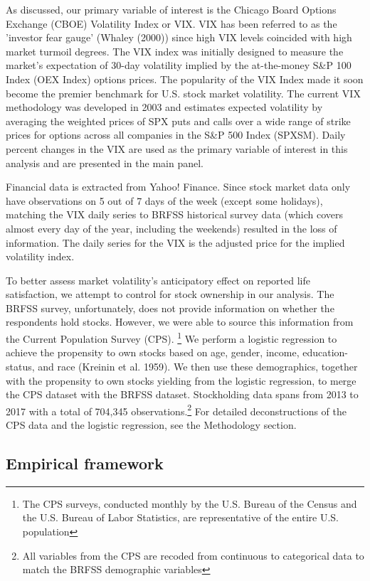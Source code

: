 \documentclass[11pt,a4paper,oldfontcommands]{memoir}
\begin{document}
{As discussed, our primary variable of interest is the Chicago Board Options Exchange (CBOE) Volatility Index or VIX. VIX has been referred to as the 'investor fear gauge' (Whaley (2000)) since high VIX levels coincided with high market turmoil degrees. The VIX index was initially designed to measure the market's expectation of 30-day volatility implied by the at-the-money S&P 100 Index (OEX Index) options prices. The popularity of the VIX Index made it soon become the premier benchmark for U.S. stock market volatility. The current VIX methodology was developed in 2003 and estimates expected volatility by averaging the weighted prices of SPX puts and calls over a wide range of strike prices for options across all companies in the S&P 500 Index (SPXSM). Daily percent changes in the VIX are used as the primary variable of interest in this analysis and are presented in the main panel.

Financial data is extracted from Yahoo! Finance. Since stock market data only have observations on 5 out of 7 days of the week (except some holidays), matching the VIX daily series to BRFSS historical survey data (which covers almost every day of the year, including the weekends) resulted in the loss of information. The daily series for the VIX is the adjusted price for the implied volatility index. 

To better assess market volatility's anticipatory effect on reported life satisfaction, we attempt to control for stock ownership in our analysis. The BRFSS survey, unfortunately, does not provide information on whether the respondents hold stocks. However, we were able to source this information from the Current Population Survey (CPS). \footnote{The CPS surveys, conducted monthly by the U.S. Bureau of the Census and the U.S. Bureau of Labor Statistics, are representative of the entire U.S. population} We perform a logistic regression to achieve the propensity to own stocks based on age, gender, income, education-status, and race (Kreinin et al. 1959). We then use these demographics, together with the propensity to own stocks yielding from the logistic regression, to merge the CPS dataset with the BRFSS dataset. Stockholding data spans from 2013 to 2017 with a total of 704,345 observations.\footnote{All variables from the CPS are recoded from continuous to categorical data to match the BRFSS demographic variables} For detailed deconstructions of the CPS data and the logistic regression, see the Methodology section. 

\subsection{Empirical framework}

}
\end{document}
